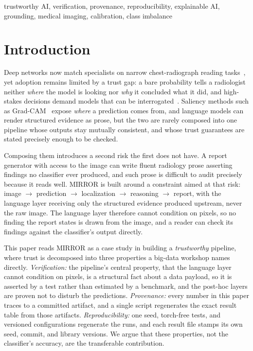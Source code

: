 \documentclass[conference]{IEEEtran}
\begin{document}
\begin{IEEEkeywords}
trustworthy AI, verification, provenance, reproducibility, explainable AI,
grounding, medical imaging, calibration, class imbalance
\end{IEEEkeywords}

\section{Introduction}

Deep networks now match specialists on narrow chest-radiograph reading
tasks~\cite{rajpurkar2017chexnet}, yet adoption remains limited by a trust gap: a
bare probability tells a radiologist neither \emph{where} the model is looking nor
\emph{why} it concluded what it did, and high-stakes decisions demand models that
can be interrogated~\cite{rudin2019stop}. Saliency methods such as
Grad-CAM~\cite{selvaraju2017gradcam} expose \emph{where} a prediction comes from,
and language models can render structured evidence as prose, but the two are rarely
composed into one pipeline whose outputs stay mutually consistent, and whose trust
guarantees are stated precisely enough to be checked.

Composing them introduces a second risk the first does not have. A report
generator with access to the image can write fluent radiology prose asserting
findings no classifier ever produced, and such prose is difficult to audit
precisely because it reads well. MIRROR is built around a constraint aimed at that
risk: image $\rightarrow$ prediction $\rightarrow$ localization $\rightarrow$
reasoning $\rightarrow$ report, with the language layer receiving only the
structured evidence produced upstream, never the raw image. The language layer
therefore cannot condition on pixels, so no finding the report states is drawn from
the image, and a reader can check its findings against the classifier's output
directly.

This paper reads MIRROR as a case study in building a \emph{trustworthy} pipeline,
where trust is decomposed into three properties a big-data workshop names directly.
\emph{Verification:} the pipeline's central property, that the language layer cannot
condition on pixels, is a structural fact about a data payload, so it is asserted by
a test rather than estimated by a benchmark, and the post-hoc layers are proven not
to disturb the predictions. \emph{Provenance:}
every number in this paper traces to a committed artifact, and a single script
regenerates the exact result table from those artifacts. \emph{Reproducibility:}
one seed, torch-free tests, and versioned configurations regenerate the runs, and
each result file stamps its own seed, commit, and library versions. We argue that
these properties, not the classifier's accuracy, are the transferable contribution.
\end{document}
